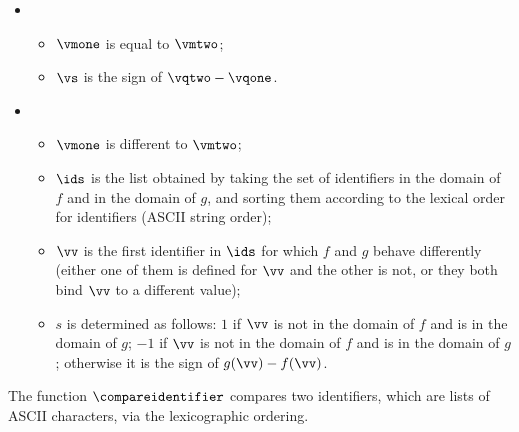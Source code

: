 \ProseParagraph
\OneApplies
\begin{itemize}
  \item {}
  \begin{itemize}
    \item $\vmone$ is equal to $\vmtwo$;
    \item $\vs$ is the sign of $\vqtwo - \vqone$.
  \end{itemize}

  \item {}
  \begin{itemize}
    \item $\vmone$ is different to $\vmtwo$;
    \item $\ids$ is the list obtained by taking the set of identifiers in the domain of $f$ and in the domain of $g$,
          and sorting them according to the lexical order for identifiers (ASCII string order);
    \item $\vv$ is the first identifier in $\ids$ for which $f$ and $g$ behave differently (either one of them is defined
          for $\vv$ and the other is not, or they both bind $\vv$ to a different value);
    \item $s$ is determined as follows: $1$ if $\vv$ is not in the domain of $f$ and is in the domain of $g$;
          $-1$ if $\vv$ is not in the domain of $f$ and is in the domain of $g$;
          otherwise it is the sign of $g(\vv)-f(\vv)$.
  \end{itemize}
\end{itemize}

\FormallyParagraph
\hypertarget{def-compareidentifier}{}
The function $\compareidentifier$ compares two identifiers, which are lists of ASCII characters,
via the lexicographic ordering.


